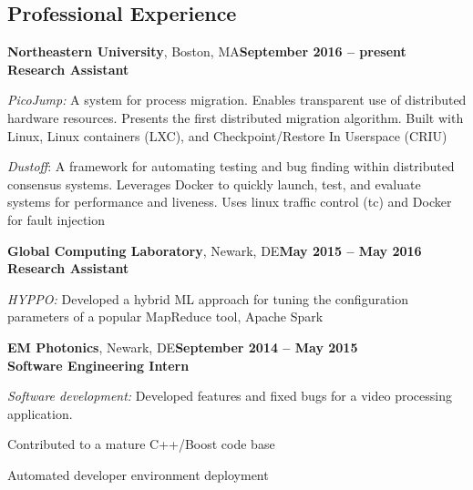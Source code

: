 \documentclass[margin,line]{resume}
\begin{document}
\begin{resume}


\section{\mysidestyle Professional Experience}
\textbf{Northeastern University}, Boston, MA\hfill\textbf{September 2016 -- present}\\
\textbf{Research Assistant}\hfill 
\vspace{-3mm}\\\vspace{-1mm}
\begin{list2}
	\item \filbreak\textit{PicoJump:} A system for process migration. Enables
    transparent use of distributed hardware resources. Presents the first
    distributed migration algorithm. Built with Linux, Linux containers (LXC),
    and Checkpoint/Restore In Userspace (CRIU)
    \item \filbreak\textit{Dustoff}: A framework for automating testing and bug
    finding within distributed consensus systems. Leverages Docker to quickly
    launch, test, and evaluate systems for performance and liveness. Uses linux
    traffic control (tc) and Docker for fault injection
\end{list2}

\textbf{Global Computing Laboratory}, Newark, DE\hfill\textbf{May 2015 -- May 2016}\\
\textbf{Research Assistant}\hfill 
\vspace{-3mm}\\\vspace{-1mm}
\begin{list2}
	\item \filbreak\textit{HYPPO:} Developed a hybrid ML approach for tuning the
    configuration parameters of a popular MapReduce tool, Apache Spark
\end{list2}

\textbf{EM Photonics}, Newark, DE\hfill\textbf{September 2014 -- May 2015}\\
\textbf{Software Engineering Intern}\hfill 
\vspace{-3mm}\\\vspace{-1mm}
\begin{list2}
	\item \filbreak\textit{Software development:} Developed features and fixed bugs for a video processing application.
    \item \filbreak Contributed to a mature C++/Boost code base
    \item \filbreak Automated developer environment deployment
\end{list2}


\end{resume}
\end{document}
